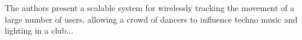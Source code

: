 The authors present a scalable system for wirelessly tracking the movement of a large number of users, allowing a crowd of dancers to influence techno music and lighting in a club...
